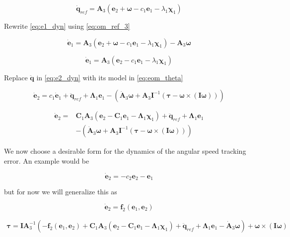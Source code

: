 \begin{equation}
\dot{\mathbf{q}}_{ref} =
\mathbf{A}_3 \left( \mathbf{e}_2 + \boldsymbol\omega - c_1 \mathbf{e}_1 - \lambda_1 \boldsymbol\chi_1 \right)
\label{eq:om_ref_3}
\end{equation}

Rewrite \eqref{eq:e1_dyn} using \eqref{eq:om_ref_3}

\[
\dot{\mathbf{e}}_1 =
\mathbf{A}_3 \left( \mathbf{e}_2 + \boldsymbol\omega - c_1 \mathbf{e}_1 - \lambda_1 \boldsymbol\chi_1 \right) -
\mathbf{A}_3 \boldsymbol\omega
\]

\[
\dot{\mathbf{e}}_1 =
\mathbf{A}_3 \left( \mathbf{e}_2 - c_1 \mathbf{e}_1 - \lambda_1 \boldsymbol\chi_1 \right)
\]

Replace $\ddot{\mathbf{q}}$ in \eqref{eq:e2_dyn} with its model in \eqref{eq:eom_theta}

\begin{equation}
\dot{\mathbf{e}}_2 =
c_1 \dot{\mathbf{e}}_1 +
\ddot{\mathbf{q}}_{ref} +
\boldsymbol\Lambda_1 \mathbf{e}_1
- \left(
	\dot{\mathbf{A}}_3 \boldsymbol\omega
	+ \mathbf{A}_3 \mathbf{I}^{-1} \left( \boldsymbol\tau - \boldsymbol\omega \times \left( \mathbf{I} \boldsymbol\omega \right) \right)
\right)
\label{eq:}
\end{equation}


\begin{align}
\nonumber
\dot{\mathbf{e}}_2 = &
\mathbf{C}_1 \mathbf{A}_3 \left( \mathbf{e}_2 - \mathbf{C}_1 \mathbf{e}_1 - \boldsymbol\Lambda_1 \boldsymbol\chi_1 \right) +
\ddot{\mathbf{q}}_{ref} +
\boldsymbol\Lambda_1 \mathbf{e}_1 \\
&- \left(
	\dot{\mathbf{A}}_3 \boldsymbol\omega
	+ \mathbf{A}_3 \mathbf{I}^{-1} \left( \boldsymbol\tau - \boldsymbol\omega \times \left( \mathbf{I} \boldsymbol\omega \right) \right)
\right)
\label{eq:}
\end{align}

We now choose a desirable form for the dynamics of the angular speed tracking error. An example would be

\[
\dot{\mathbf{e}}_2 = -c_2 \mathbf{e}_2 - \mathbf{e}_1
\]

but for now we will generalize this as

\[
\dot{\mathbf{e}}_2 = \mathbf{f}_2 \left( \mathbf{e}_1, \mathbf{e}_2 \right)
\]



\begin{align}
\nonumber
\boldsymbol\tau 
=
\mathbf{I} \mathbf{A}_3^{-1}
\left(
	-\mathbf{f}_2 \left( \mathbf{e}_1, \mathbf{e}_2 \right)
	+ \mathbf{C}_1 \mathbf{A}_3 \left(
		\mathbf{e}_2 - \mathbf{C}_1 \mathbf{e}_1 - \boldsymbol\Lambda_1 \boldsymbol\chi_1
	\right)
	+ \ddot{\mathbf{q}}_{ref}
	+ \boldsymbol\Lambda_1 \mathbf{e}_1
	- \dot{\mathbf{A}}_3 \boldsymbol\omega
\right)
+ \boldsymbol\omega \times \left( \mathbf{I} \boldsymbol\omega \right)
\end{align}



